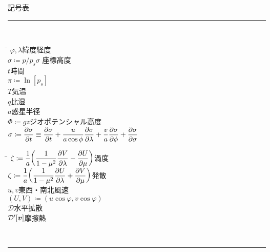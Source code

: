 \documentclass[body]{subfiles}
\begin{document}
\begin{table}[t]
	\centering
	\caption{記号表}\label{記号表}
	\begin{minipage}{.8\textwidth}
		\rule[0pt]{\textwidth}{\heavyrulewidth}\\
		\begin{minipage}{.5\textwidth}
			\hfill
			\begin{tabbing}
				\hspace*{3\zw}\=\kill
				\(\varphi,\lambda\)\>緯度経度\\
				\(\sigma\coloneqq p/p_s\)\quad\(\sigma\) 座標高度\\
				\(t\)\>時間\\
				\(\pi\coloneqq\ln[p_s]\)\\
				\(T\)\>気温\\
				\(q\)\>比湿\\
				\(a\)\>惑星半径\\
				\(\Phi\coloneqq gz\)\quad ジオポテンシャル高度\\
				\(\displaystyle\sigma\coloneqq\pdv{\sigma}{t}\equiv
					\pdv{\sigma}{t}+\frac{u}{a\cos\phi}\pdv{\sigma}{\lambda}
					+\frac{v}{a}\pdv{\sigma}{\phi}+\pdv{\sigma}{\sigma}\)\\
			\end{tabbing}
		\end{minipage}
		\hfill
		\begin{minipage}{.5\textwidth}
			\hfill
			\begin{tabbing}
				\hspace*{3\zw}\=\kill
				\(\displaystyle\zeta\coloneqq\frac{1}{a}\qty(\frac{1}{1-\mu^2}\pdv{V}{\lambda}-\pdv{U}{\mu})\)\quad 渦度\\
				\(\displaystyle\zeta\coloneqq\frac{1}{a}\qty(\frac{1}{1-\mu^2}\pdv{U}{\lambda}+\pdv{V}{\mu})\)\quad 発散\\
				\(u,v\)\>東西・南北風速\\
				\((U,V)\coloneqq(u\cos\varphi,v\cos\varphi)\)\\
				\(\mathcal{D}\)\>水平拡散\\
				\(\mathcal{D}'[\vb*{v}]\)\>摩擦熱
			\end{tabbing}
		\end{minipage}\\
		\rule[0pt]{\textwidth}{\heavyrulewidth}
	\end{minipage}
\end{table}
\end{document}
